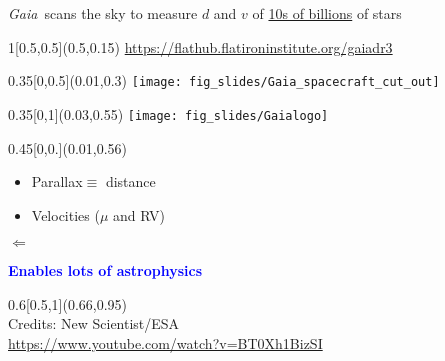 \documentclass[xcolor=dvipsnames,professionalfonts, aspectratio=169]{beamer}
\begin{document}
\begin{frame}{\emph{Gaia}~scans the sky to measure $d$ and
    $v$ of \underline{10s of billions} of stars}


  \begin{textblock}{1}[0.5,0.5](0.5,0.15)
    \centering\small
    \url{https://flathub.flatironinstitute.org/gaiadr3}
  \end{textblock}


  \begin{textblock}{0.35}[0,0.5](0.01,0.3)
    \texttt{[image: fig\_slides/Gaia\_spacecraft\_cut\_out]}
  \end{textblock}
  \begin{textblock}{0.35}[0,1](0.03,0.55)
    \texttt{[image: fig\_slides/Gaialogo]}
  \end{textblock}

  \begin{textblock}{0.45}[0,0.](0.01,0.56)
    \begin{itemize}\color{black}
    \item Parallax$\equiv$ distance
    \item Velocities ($\mu$ and RV)
    \end{itemize}
    \vspace*{-10pt}
    \hspace*{70pt}\begin{sideways}
      $\Leftarrow$
    \end{sideways}

    \textbf{\textcolor{Blue}{Enables lots of astrophysics}}
  \end{textblock}

  \begin{textblock}{0.6}[0.5,1](0.66,0.95)
    \centering
    \\
    \textcolor{gray!50}{\tiny Credits: New Scientist/ESA}\\[-7pt]
    \textcolor{gray!50}{\tiny \url{https://www.youtube.com/watch?v=BT0Xh1BizSI}}
  \end{textblock}
\end{frame}
\end{document}
